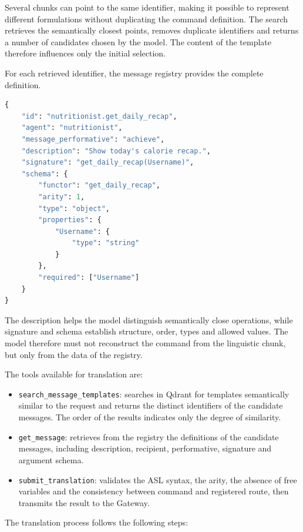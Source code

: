 \documentclass[12pt,a4paper]{article}
\begin{document}
Several chunks can point to the same identifier, making it possible to represent different
formulations without duplicating the command definition. The search retrieves the semantically closest
points, removes duplicate identifiers and returns a number of candidates chosen by the model. 
The content of the template therefore influences only the initial selection.

For each retrieved identifier, the message registry provides the complete definition.
\begin{lstlisting}[language=Python,caption={Example of message definition in the registry}]
{
    "id": "nutritionist.get_daily_recap",
    "agent": "nutritionist",
    "message_performative": "achieve",
    "description": "Show today's calorie recap.",
    "signature": "get_daily_recap(Username)",
    "schema": {
        "functor": "get_daily_recap",
        "arity": 1,
        "type": "object",
        "properties": {
            "Username": {
                "type": "string"
            }
        },
        "required": ["Username"]
    }
}
\end{lstlisting}

The description helps the model distinguish semantically close operations, while signature and
schema establish structure, order, types and allowed values. The model therefore must not reconstruct
the command from the linguistic chunk, but only from the data of the registry.

The tools available for translation are:

\begin{itemize}
    \item \texttt{search\_message\_templates}: searches in Qdrant for templates semantically similar to 
    the request and returns the distinct identifiers of the candidate messages. The order of the results 
    indicates only the degree of similarity.
    \item \texttt{get\_message}: retrieves from the registry the definitions of the candidate messages, 
    including description, recipient, performative, signature and argument schema.
    \item \texttt{submit\_translation}: validates the ASL syntax, the arity, the absence of free variables and the 
    consistency between command and registered route, then transmits the result to the Gateway.
\end{itemize}

The translation process follows the following steps:
\end{document}
